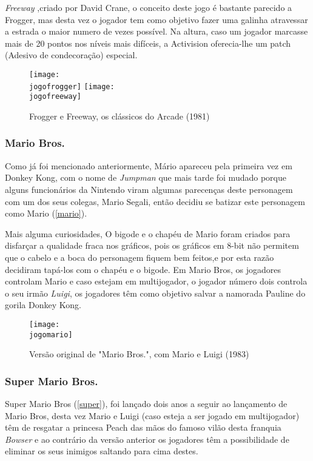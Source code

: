 \documentclass{report}
\begin{document}
\textit{Freeway} ,criado por David Crane, o conceito deste jogo é bastante parecido a Frogger, mas desta vez o jogador tem como objetivo fazer uma galinha atravessar a estrada o maior numero de vezes possível. Na altura, caso um jogador marcasse mais de 20 pontos nos níveis mais difíceis, a Activision oferecia-lhe um patch (Adesivo de condecoração) especial.

\begin{figure}[h]
\center
\texttt{[image: \\jogofrogger]}
\texttt{[image: \\jogofreeway]}
\caption{Frogger e Freeway, os clássicos do Arcade (1981) \cite{atari}}
\label{frog}
\end{figure}

\subsubsection{Mario Bros.}
\label{subsubsec.Mario Bros.}
Como já foi mencionado anteriormente, Mário apareceu pela primeira vez em Donkey Kong, com o nome de \textit{Jumpman} que mais tarde foi mudado porque alguns funcionários da Nintendo viram algumas parecenças deste personagem com um dos seus colegas, Mario Segali, então decidiu se batizar este personagem como Mario (\autoref{mario}).

Mais alguma curiosidades, O bigode e o chapéu de Mario foram criados para disfarçar a qualidade fraca nos gráficos, pois os gráficos em 8-bit não permitem que o cabelo e a boca do personagem fiquem bem feitos,e por esta razão decidiram tapá-los com o chapéu e o bigode. Em Mario Bros, os jogadores controlam Mario e caso estejam em multijogador, o jogador número dois controla o seu irmão \textit{Luigi}, os jogadores têm como objetivo salvar a namorada Pauline do gorila Donkey Kong.

\begin{figure}[h]
\center
\texttt{[image: \\jogomario]}
\caption{Versão original de "Mario Bros.", com Mario e Luigi (1983) \cite{mariobros}}
\label{mario}
\end{figure}

\subsubsection{Super Mario Bros.}
\label{subsubsec.Super Mario Bros.}
Super Mario Bros (\autoref{super}), foi lançado dois anos a seguir ao lançamento de Mario Bros, desta vez Mario e Luigi (caso esteja a ser jogado em multijogador) têm de resgatar a princesa Peach das mãos do famoso vilão desta franquia \textit{Bowser} e ao contrário da versão anterior os jogadores têm a possibilidade de eliminar os seus inimigos saltando para cima destes.
\end{document}
